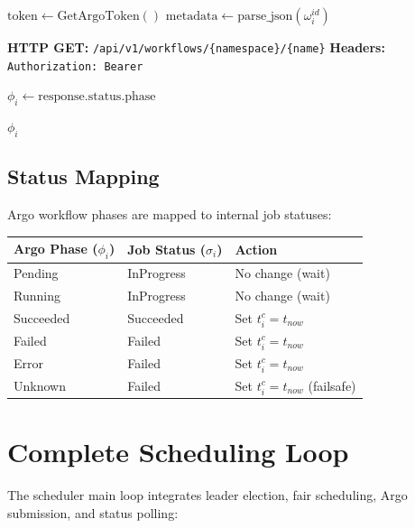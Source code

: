 \documentclass[11pt]{article}
\begin{document}
\begin{algorithm}[H]
\caption{Poll Workflow Status}
\begin{algorithmic}[1]
  \State $\text{token} \gets \text{GetArgoToken}()$
  \State $\text{metadata} \gets \text{parse\_json}(\omega_i^{id})$

  \State \textbf{HTTP GET:} \texttt{/api/v1/workflows/\{namespace\}/\{name\}}
  \State \quad \textbf{Headers:} \texttt{Authorization: Bearer }

  \State $\phi_i \gets \text{response.status.phase}$

  \State \Return $\phi_i$
\EndProcedure
\end{algorithmic}
\end{algorithm}

\subsection{Status Mapping}

Argo workflow phases are mapped to internal job statuses:

\begin{center}
\begin{tabular}{p{4cm}p{4cm}p{6cm}}
\toprule
\textbf{Argo Phase} ($\phi_i$) & \textbf{Job Status} ($\sigma_i$) & \textbf{Action} \\
\midrule
Pending & InProgress & No change (wait) \\
Running & InProgress & No change (wait) \\
Succeeded & Succeeded & Set $t_i^c = t_{now}$ \\
Failed & Failed & Set $t_i^c = t_{now}$ \\
Error & Failed & Set $t_i^c = t_{now}$ \\
Unknown & Failed & Set $t_i^c = t_{now}$ (failsafe) \\
\bottomrule
\end{tabular}
\end{center}

\section{Complete Scheduling Loop}

The scheduler main loop integrates leader election, fair scheduling, Argo submission, and status polling:
\end{document}
